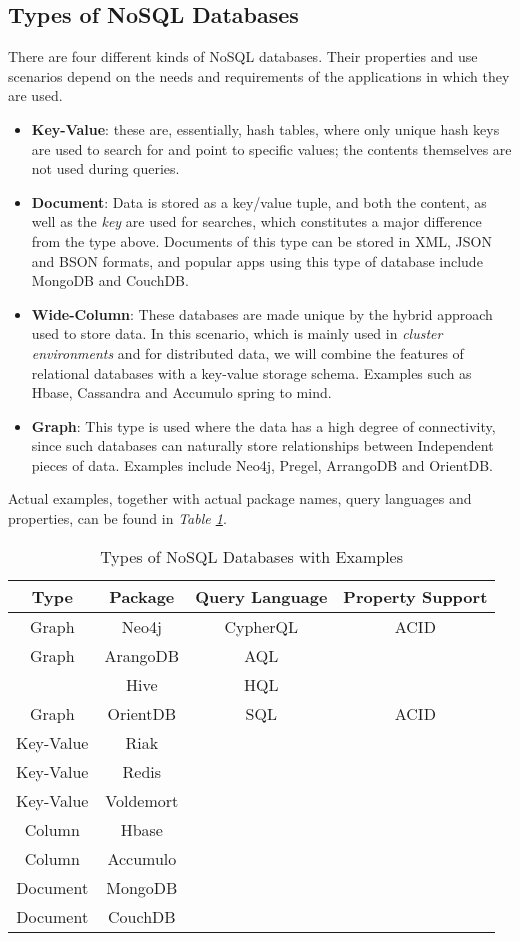 \documentclass[10pt,        %
               a4paper,     %
               journal,     %
               ]{IEEEtran}
\begin{document}
\subsection{Types of NoSQL Databases}
There are four different kinds of NoSQL databases. Their properties and use scenarios depend on the needs and requirements of the applications in which they are used. 
\begin{itemize}
	\item \textbf{Key-Value}: these are, essentially, hash tables, where only unique hash keys are used to search for and point to specific values; the contents themselves are not used during queries.
	\item \textbf{Document}: Data is stored as a key/value tuple, and both the content, as well as the \textit{key} are used for searches, which constitutes a major difference from the type above. Documents of this type can be stored in XML, JSON and BSON formats, and popular apps using this type of database include MongoDB and CouchDB.
	\item \textbf{Wide-Column}: These databases are made unique by the hybrid approach used to store data. In this scenario, which is mainly used in \textit{cluster environments} and for distributed data, we will combine the features of relational databases with a key-value storage schema. Examples such as Hbase, Cassandra and Accumulo spring to mind.
	\item \textbf{Graph}: This type is used where the data has a high degree of connectivity, since such databases can naturally store relationships between Independent pieces of data. Examples include Neo4j, Pregel, ArrangoDB and OrientDB. 
\end{itemize}
Actual examples, together with actual package names, query languages and properties, can be found in \textit{Table \ref{table_types_nosql}}. 

\begin{table}[!t]
	\renewcommand{\arraystretch}{1.3} %
	\caption{Types of NoSQL Databases with Examples}
	\label{table_types_nosql}
	\centering
	\begin{tabular}{|c|c|c|c|}
		\hline
		Type & Package & Query Language & Property Support  \\
		\hline
		Graph & Neo4j & CypherQL & ACID \\
		\hline
		Graph & ArangoDB & AQL & \\
		\hline
		 & Hive & HQL & \\
		\hline
		Graph & OrientDB & SQL & ACID \\
		\hline
		Key-Value & Riak & &  \\
		\hline
		Key-Value & Redis & & \\
		\hline
		Key-Value & Voldemort & & \\
		\hline
		Column & Hbase & & \\
		\hline
		Column & Accumulo & & \\
		\hline
		Document & MongoDB & & \\
		\hline
		Document & CouchDB & & \\
		\hline
	\end{tabular}
\end{table}
\end{document}
